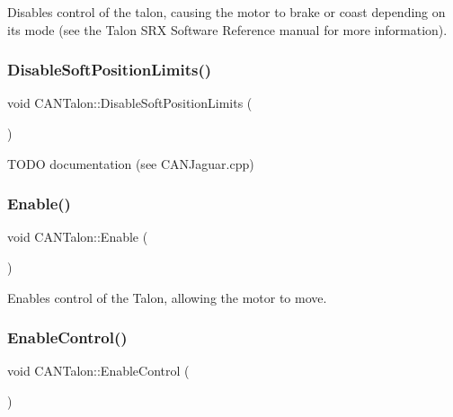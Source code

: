 Disables control of the talon, causing the motor to brake or coast depending on its mode (see the Talon S\+RX Software Reference manual for more information). \mbox{\label{class_c_a_n_talon_a5fda4cb5db6d3b4b400222f549d91621}} 
\subsubsection{\texorpdfstring{Disable\+Soft\+Position\+Limits()}{DisableSoftPositionLimits()}}
{\footnotesize\ttfamily void C\+A\+N\+Talon\+::\+Disable\+Soft\+Position\+Limits (\begin{DoxyParamCaption}{ }\end{DoxyParamCaption})\hspace{0.3cm}{\ttfamily [override]}}

T\+O\+DO documentation (see C\+A\+N\+Jaguar.\+cpp) \mbox{\label{class_c_a_n_talon_a564c64c730580b6f80cf6c5f9eb42032}} 
\subsubsection{\texorpdfstring{Enable()}{Enable()}}
{\footnotesize\ttfamily void C\+A\+N\+Talon\+::\+Enable (\begin{DoxyParamCaption}{ }\end{DoxyParamCaption})\hspace{0.3cm}{\ttfamily [override]}}

Enables control of the Talon, allowing the motor to move. \mbox{\label{class_c_a_n_talon_a174cae574f8c73a4d211d7484fddd7ef}} 
\subsubsection{\texorpdfstring{Enable\+Control()}{EnableControl()}}
{\footnotesize\ttfamily void C\+A\+N\+Talon\+::\+Enable\+Control (\begin{DoxyParamCaption}{ }\end{DoxyParamCaption})\hspace{0.3cm}{\ttfamily [virtual]}}

